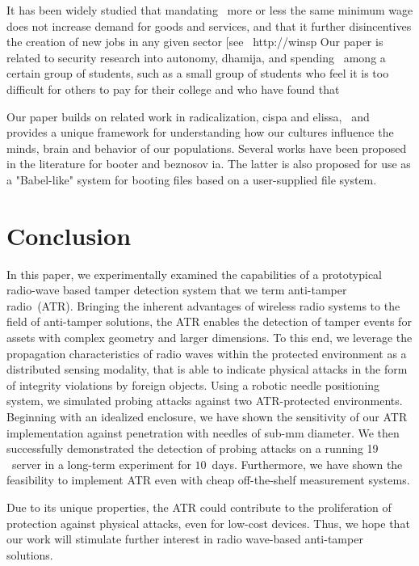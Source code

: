 \documentclass[conference]{IEEEtran}
\newcommand{\inch}{\,\textquotedbl}
\begin{document}
 

It has been widely studied that mandating  more or less the same minimum wage does not increase demand for goods and services, and that it further disincentives the creation of new jobs in any given sector [see  http://winsp Our paper is related to security research into autonomy, dhamija, and spending  among a certain group of students, such as a small group of students who feel it is too difficult for others to pay for their college and who have found that

Our paper builds on related work in radicalization, cispa and elissa,  and provides a unique framework for understanding how our cultures influence the minds, brain and behavior of our populations. Several works have been proposed in the literature for booter and beznosov ia. The latter is also proposed for use as a "Babel-like" system for booting files based on a user-supplied file system.
\section{Conclusion}

In this paper, we experimentally examined the capabilities of a prototypical radio-wave based tamper detection system that we term anti-tamper radio~(ATR). Bringing the inherent advantages of wireless radio systems to the field of anti-tamper solutions, the ATR enables the detection of tamper events for assets with complex geometry and larger dimensions. To this end, we leverage the propagation characteristics of radio waves within the protected environment as a distributed sensing modality, that is able to indicate physical attacks in the form of integrity violations by foreign objects. Using a robotic needle positioning system, we simulated probing attacks against two ATR-protected environments. Beginning with an idealized enclosure, we have shown the sensitivity of our ATR implementation against penetration with needles of \mbox{sub-mm} diameter. We then successfully demonstrated the detection of probing attacks on a running 19\inch~server in a long-term experiment for $10$~days. Furthermore, we have shown the feasibility to implement ATR even with cheap off-the-shelf measurement systems.

Due to its unique properties, the ATR could contribute to the proliferation of protection against physical attacks, even for low-cost devices. Thus, we hope that our work will stimulate further interest in radio wave-based anti-tamper solutions.
\end{document}
